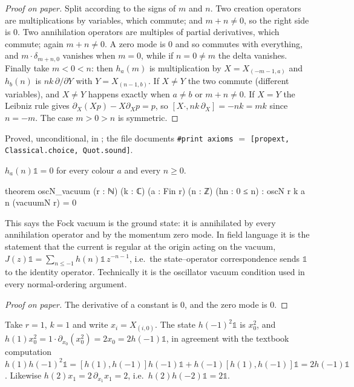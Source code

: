 \begin{proof}[Proof on paper]
Split according to the signs of $m$ and $n$. Two creation operators are multiplications by
variables, which commute; and $m+n\ne 0$, so the right side is $0$. Two annihilation operators
are multiples of partial derivatives, which commute; again $m+n\neq0$. A zero mode is $0$ and so
commutes with everything, and $m\cdot\delta_{m+n,0}$ vanishes when $m=0$, while if $n=0\ne m$ the
delta vanishes. Finally take $m<0<n$: then $h_a(m)$ is multiplication by $X=X_{(-m-1,a)}$ and
$h_b(n)$ is $nk\,\partial/\partial Y$ with $Y=X_{(n-1,b)}$. If $X\neq Y$ the two commute
(different variables), and $X\ne Y$ happens exactly when $a\ne b$ or $m+n\ne0$. If $X=Y$ the
Leibniz rule gives $\partial_X(Xp)-X\partial_Xp=p$, so
$[X\cdot, nk\,\partial_X]=-nk=mk$ since $n=-m$. The case $m>0>n$ is symmetric.
\end{proof}

\begin{status}
Proved, unconditional, in ; the file documents
\texttt{\#print axioms} $=$ \texttt{[propext, Classical.choice, Quot.sound]}.
\end{status}

\begin{proposition}[Vacuum]\label{ch03:prop:vacuum}
$h_a(n)\mathbb 1=0$ for every colour $a$ and every $n\geq 0$.
\end{proposition}
\begin{leancode}
theorem oscN_vacuum (r : ℕ) (k : ℂ) (a : Fin r) (n : ℤ) (hn : 0 ≤ n) :
    oscN r k a n (vacuumN r) = 0
\end{leancode}

\begin{physics}
This says the Fock vacuum is the ground state: it is annihilated by every annihilation operator and by the momentum zero mode. In field language it is the statement that the current is regular at the origin acting on the vacuum, $J(z)\mathbb 1=\sum_{n\le-1}h(n)\mathbb 1\,z^{-n-1}$, i.e.\ the state--operator correspondence sends $\mathbb 1$ to the identity operator. Technically it is the oscillator vacuum condition used in every normal-ordering argument.
\end{physics}
\begin{proof}[Proof on paper]
The derivative of a constant is $0$, and the zero mode is $0$.
\end{proof}

\begin{example}\label{ch03:ex:smallcomp}
Take $r=1$, $k=1$ and write $x_i=X_{(i,0)}$. The state $h(-1)^2\mathbb 1$ is $x_0^2$, and
$h(1)x_0^2 = 1\cdot\partial_{x_0}(x_0^2)=2x_0 = 2h(-1)\mathbb 1$, in agreement with the textbook
computation $h(1)h(-1)^2\mathbb 1=[h(1),h(-1)]h(-1)\mathbb1+h(-1)[h(1),h(-1)]\mathbb1=2h(-1)\mathbb1$.
Likewise $h(2)x_1=2\,\partial_{x_1}x_1=2$, i.e.\ $h(2)h(-2)\mathbb 1=2\mathbb 1$.
\end{example}


